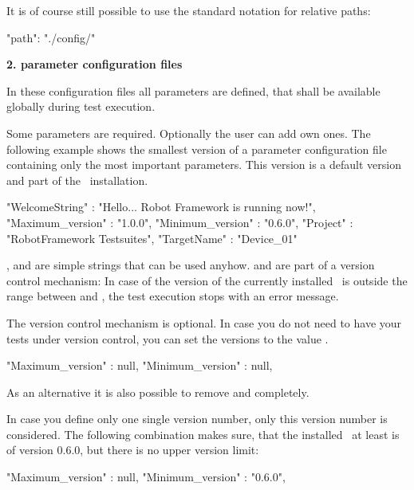 It is of course still possible to use the standard notation for relative paths:

\begin{pythoncode}
"path": "./config/"
\end{pythoncode}

\newpage

\textbf{2. parameter configuration files}

In these configuration files all parameters are defined, that shall be available globally during test execution.

Some parameters are required. Optionally the user can add own ones. The following example shows the smallest version
of a parameter configuration file containing only the most important parameters. This version is a default version and part of the
\pkg\ installation.

\begin{pythoncode}
{
  "WelcomeString"   : "Hello... Robot Framework is running now!",
  "Maximum_version" : "1.0.0",
  "Minimum_version" : "0.6.0",
  "Project"         : "RobotFramework Testsuites",
  "TargetName"      : "Device_01"
}
\end{pythoncode}

,  and  are simple strings that can be used anyhow. 
and  are part of a version control mechanism: In case of the version of the currently installed
\rfwcore\ is outside the range between  and , the test execution stops
with an error message.

The version control mechanism is optional. In case you do not need to have your tests under version control, you can set 
the versions to the value .

\begin{pythoncode}
"Maximum_version" : null,
"Minimum_version" : null,
\end{pythoncode}

As an alternative it is also possible to remove  and  completely.

In case you define only one single version number, only this version number is considered. The following combination
makes sure, that the installed \rfwcore\ at least is of version 0.6.0, but there is no upper version limit:

\begin{pythoncode}
"Maximum_version" : null,
"Minimum_version" : "0.6.0",
\end{pythoncode}

